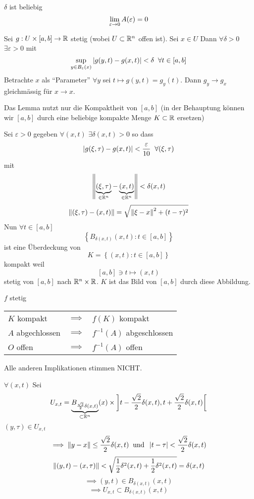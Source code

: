 \begin{Bew}
  $\delta$ ist beliebig
  \[\displaystyle\lim_{\varepsilon\rightarrow0}A(\varepsilon)=0\]
  \begin{Lem}
    Sei $g:U\times [a,b]\rightarrow\mathbb{R}$ stetig (wobei $U\subset\mathbb{R}^n$ offen ist). Sei $x\in U$ Dann $\forall \delta >0$ $\exists \varepsilon>0$ mit
    \[\sup_{y\in B_\varepsilon(x)}\left| g(y,t)-g(x,t) \right|<\delta\hspace{2mm}\forall t\in [a,b]\]
    Betrachte $x$ als ``Parameter'' $\forall y$ sei $t\mapsto g(y,t)=g_y(t)$. Dann $g_y\to g_x$ gleichmässig für $x\to x$.
  \end{Lem}
  \begin{Bem}
    Das Lemma nutzt nur die Kompaktheit von $[a,b]$ (in der Behauptung können wir $[a,b]$ durch eine beliebige kompakte Menge $K\subset\mathbb{R}$ ersetzen)
  \end{Bem}
  \begin{Bew}
    Sei $\varepsilon>0$ gegeben $\forall (x,t)$ $\exists \delta(x,t)>0$ so dass
    \[\left| g(\xi, \tau)-g(x,t) \right|<\frac{\varepsilon}{10}\hspace{2mm}\forall (\xi, \tau)\]
    mit
    \[\left\| \underbrace{(\xi,\tau)}_{\in \mathbb{R}^n}-\underbrace{(x,t)}_{\in \mathbb{R}^n} \right\|<\delta(x,t)\]
    \[\left\| (\xi,\tau)-(x,t) \right\|=\sqrt{\left\| \xi-x \right\|^2+(t-\tau)^2}\]
    Nun $\forall t\in [a,b]$
    \[\left\{ B_{\delta(x,t)}(x,t):t\in [a,b] \right\}\]
    ist eine Überdeckung von
    \[K = \left\{ (x,t):t\in [a,b] \right\}\]
    kompakt weil
    \[\left[ a,b \right]\ni t\mapsto(x,t)\]
    stetig von $[a,b]$ nach $\mathbb{R}^n\times\mathbb{R}$. $K$ ist das Bild von $[a,b]$ durch diese Abbildung.
  \end{Bew}
  \begin{Bem}
    $f$ stetig
    \begin{tabular}{lcl}
      $K$ kompakt & $\implies$ & $f(K)$ kompakt\\
      $A$ abgechlossen & $\implies$ & $f^{-1}(A)$ abgeschlossen\\
      $O$ offen & $\implies$ & $f^{-1}(A)$ offen
    \end{tabular}
    Alle anderen Implikationen stimmen NICHT.
  \end{Bem}
  $\forall (x,t)$ Sei
  \[U_{x,t}=\underbrace{B_{\frac{\sqrt{2}}{2}\delta(x,t)}}_{\subset\mathbb{R}^n}(x)\times \left] t-\frac{\sqrt{2}}{2}\delta(x,t),t+\frac{\sqrt{2}}{2}\delta(x,t) \right[\]
  $(y,\tau)\in U_{x,t}$
  \[\implies \left\| y-x \right\|\leq\frac{\sqrt{2}}{2}\delta(x,t)\hspace{2mm}\text{und}\hspace{2mm}\left| t-\tau \right|<\frac{\sqrt{2}}{2}\delta(x,t)\]
  \[\left\| (y,t)-(x,\tau) \right\|<\sqrt{\frac{1}{2}\delta^2(x,t)+\frac{1}{2}\delta^2(x,t)}=\delta(x,t)\]
  \[\implies (y,t)\in B_{\delta(x,t)}(x,t)\]
  \[\implies U_{x,t}\subset B_{\delta(x,t)}(x,t)\]

\end{Bew}
